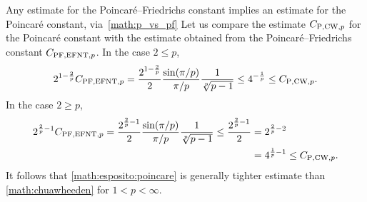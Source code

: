 \documentclass[10pt,letterpaper]{article}
\begin{document}
\begin{remark}
    Any estimate for the Poincar\'e--Friedrichs constant implies an estimate for the Poincar\'e constant, via~\eqref{math:p_vs_pf}
    Let us compare the estimate $C_{{\rm P},{\rm CW},p}$ for the Poincar\'e constant
    with the estimate obtained from the Poincar\'e--Friedrichs constant $C_{{\rm PF},{\rm EFNT},p}$. 
    In the case $2 \leq p$, 
    \begin{align*}
        2^{1-\frac 2 p}
        C_{{\rm PF},{\rm EFNT},p}
        =
        \frac{ 2^{1-\frac 2 p} }{2}
        \frac{ \sin(\pi/p) }{ \pi/p }
        \frac{ 1 }{ \sqrt[p]{p-1} }
        \leq 
        4^{-\frac 1 p}
        \leq
        C_{{\rm P},{\rm CW},p} 
        .
    \end{align*}
    In the case $2 \geq p$, 
    \begin{align*}
        2^{\frac 2 p - 1}
        C_{{\rm PF},{\rm EFNT},p}
        =
        \frac{ 2^{\frac 2 p - 1} }{2}
        \frac{ \sin(\pi/p) }{ \pi/p }
        \frac{ 1 }{ \sqrt[p]{p-1} }
        \leq
        \frac{ 2^{\frac 2 p-1} }{2}
        &
        =
        2^{\frac 2 p - 2}
        \\&
        =
        4^{\frac 1 p - 1}
        \leq
        C_{{\rm P},{\rm CW},p} 
        .
    \end{align*}
    It follows that \eqref{math:esposito:poincare} is generally tighter estimate than \eqref{math:chuawheeden} for $1 < p < \infty$.

\end{remark}
\end{document}
